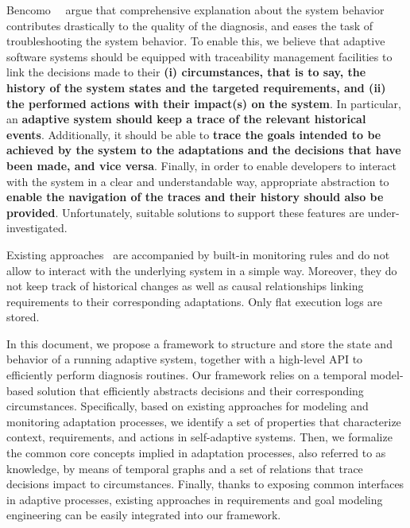 Bencomo~\etal~\cite{DBLP:conf/iceccs/BencomoWSW12} argue that comprehensive explanation about the system behavior contributes drastically to the quality of the diagnosis, and eases the task of troubleshooting the system behavior.
To enable this, we believe that adaptive software systems should be equipped with traceability management facilities to link the decisions made to their \textbf{(i) circumstances, that is to say, the history of the system states and the targeted requirements, and (ii) the performed actions with their impact(s) on the system}.
In particular, an \textbf{adaptive system should keep a trace of the relevant historical events}.
Additionally, it should be able to \textbf{trace the goals intended to be achieved by the system to the adaptations and the decisions that have been made, and vice versa}. 
Finally, in order to enable developers to interact with the system in a clear and understandable way, appropriate abstraction to \textbf{enable the navigation of the traces and their history should also be provided}.
Unfortunately, suitable solutions to support these features are under-investigated. 

Existing approaches~\cite{hassel13,heinrich14,ehlers11,DBLP:conf/icse/MendoncaAR14,DBLP:conf/icse/CasanovaGSA14,DBLP:conf/icse/IftikharW14a} are accompanied by built-in monitoring rules and do not allow to interact with the underlying system in a simple way. 
Moreover, they do not keep track of historical changes as well as causal relationships linking requirements to their corresponding adaptations. Only flat execution logs are stored. 

In this document, we propose a framework to structure and store the state and behavior of a running adaptive system, together with a high-level API to efficiently perform diagnosis routines. 
Our framework relies on a temporal model-based solution that efficiently abstracts decisions and their corresponding circumstances.
Specifically, based on existing approaches for modeling and monitoring adaptation processes, we identify a set of properties that characterize context, requirements, and actions in self-adaptive systems.    
Then, we formalize the common core concepts implied in adaptation processes, also referred to as knowledge, by means of temporal graphs and a set of relations that trace decisions impact to circumstances.
Finally, thanks to exposing common interfaces in adaptive processes, existing approaches in requirements and goal modeling engineering can be easily integrated into our framework. 

